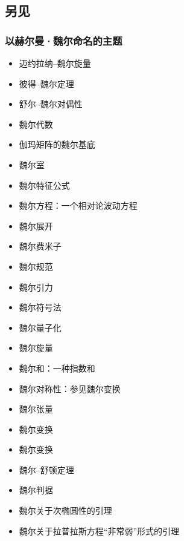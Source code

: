 \subsection{另见} 
\subsubsection{以赫尔曼·魏尔命名的主题}  
\begin{itemize}
\item 迈约拉纳–魏尔旋量  
\item 彼得–魏尔定理  
\item 舒尔–魏尔对偶性  
\item 魏尔代数  
\item 伽玛矩阵的魏尔基底  
\item 魏尔室  
\item 魏尔特征公式  
\item 魏尔方程：一个相对论波动方程  
\item 魏尔展开  
\item 魏尔费米子  
\item 魏尔规范  
\item 魏尔引力  
\item 魏尔符号法  
\item 魏尔量子化  
\item 魏尔旋量  
\item 魏尔和：一种指数和  
\item 魏尔对称性：参见魏尔变换  
\item 魏尔张量  
\item 魏尔变换  
\item 魏尔变换  
\item 魏尔–舒顿定理  
\item 魏尔判据  
\item 魏尔关于次椭圆性的引理  
\item 魏尔关于拉普拉斯方程“非常弱”形式的引理  
\end{itemize}
